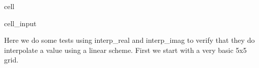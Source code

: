 \documentclass[letterpaper,10pt,english]{jupyterBook}
\begin{document}
\begin{sphinxuseclass}{cell}
\begin{sphinxVerbatimInput}
\begin{sphinxuseclass}{cell_input}
\begin{sphinxVerbatim}[commandchars=\\\{\}]
          
          

      
      

         
\end{sphinxVerbatim}

\end{sphinxuseclass}\end{sphinxVerbatimInput}

\end{sphinxuseclass}
\sphinxAtStartPar
Here we do some tests using interp\_real and interp\_imag to verify that they do interpolate a value using a linear scheme. First we start with a very basic 5x5 grid.
\end{document}
